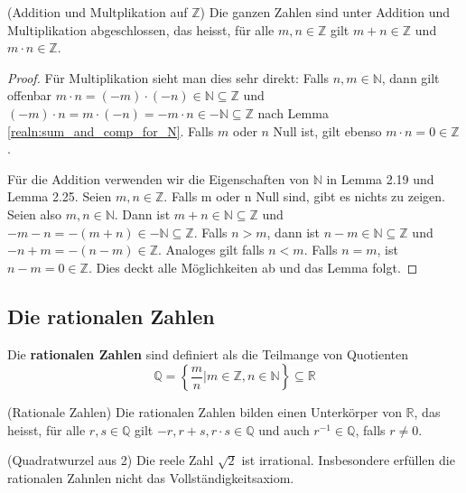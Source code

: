 \documentclass[../Analysis1_script.tex]{subfiles}
\begin{document}
\begin{lemma}{(Addition und Multplikation auf $\mathbb{Z}$)}
Die ganzen Zahlen sind unter Addition und Multiplikation abgeschlossen, das heisst, für alle $m, n \in \mathbb{Z}$ gilt $m + n \in \mathbb{Z}$ und $m \cdot n \in \mathbb{Z}$.
\end{lemma}

\begin{proof}
	Für Multiplikation sieht man dies sehr direkt: Falls $n, m \in \mathbb{N}$, dann gilt offenbar $m \cdot n = (-m) \cdot (-n) \in \mathbb{N} \subseteq \mathbb{Z}$ und $(-m) \cdot n = m \cdot (-n) = -m \cdot n \in -\mathbb{N} \subseteq \mathbb{Z}$ nach Lemma \ref{realn:sum_and_comp_for_N}. Falls $m$ oder $n$ Null ist, gilt ebenso $m \cdot n = 0 \in \mathbb{Z}$.
	
	Für die Addition verwenden wir die Eigenschaften von $\mathbb{N}$ in Lemma 2.19 und Lemma 2.25. Seien $m,n\in \mathbb{Z}$. Falls m oder n Null sind, gibt es nichts zu zeigen. Seien also $m,n \in \mathbb{N}$. Dann ist $m+n \in \mathbb {N}\subseteq \mathbb {Z}$ und $-m-n = -(m+n) \in -\mathbb{N} \subseteq \mathbb{Z}$. Falls $n > m$, dann ist $n-m\in \mathbb{N}\subseteq \mathbb{Z}$ und $-n + m = -(n-m) \in \mathbb{Z}$. Analoges gilt falls $n < m$. Falls $n=m$, ist $n-m = 0 \in \mathbb{Z}$. Dies deckt alle Möglichkeiten ab und das Lemma folgt.
\end{proof}

\subsection{Die rationalen Zahlen}
Die \textbf{rationalen Zahlen} sind definiert als die Teilmange von Quotienten 
\begin{equation}
	\mathbb{Q} = \left\{\frac{m}{n}| m \in \mathbb{Z}, n \in \mathbb{N}\right\} \subseteq \mathbb{R}
\end{equation}  

\begin{lemma}{(Rationale Zahlen)}
	Die rationalen Zahlen bilden einen Unterkörper von $\mathbb{R}$, das heisst, für alle $r, s \in \mathbb{Q}$ gilt $-r, r + s, r \cdot s \in \mathbb{Q}$ und auch $r^{-1} \in \mathbb{Q}$, falls $r \neq 0$.
\end{lemma}

\begin{lemma}{(Quadratwurzel aus 2)}
	Die reele Zahl $\sqrt{2}$ ist irrational. Insbesondere erfüllen die rationalen Zahnlen nicht das Vollständigkeitsaxiom.
\end{lemma}
\end{document}
